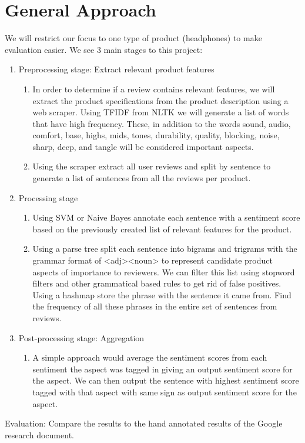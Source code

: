\documentclass{article}
\begin{document}
\section{General Approach}
We will restrict our focus to one type of product (headphones) to make evaluation easier. We see 3 main stages to this project:

\begin{enumerate}
\item Preprocessing stage: Extract relevant product features
\newline 
	\begin{enumerate} [label* = \arabic*.]
	\item	In order to determine if a review contains relevant features, we will extract the product specifications from the product description using a web scraper. Using TFIDF from NLTK we will generate a list of words that have high frequency. These, in addition to the words sound, audio, comfort, base, highs, mids, tones, durability, quality, blocking, noise, sharp, deep, and tangle will be considered important aspects. 
	\\
	\item Using the scraper extract all user reviews and split by sentence to generate a list of sentences from all the reviews per product.
	\end{enumerate}
\item Processing stage
	\begin{enumerate} [label* = \arabic*.]
	\item Using SVM or Naive Bayes annotate each sentence with a sentiment score based on the previously created list of relevant features for the product. 
	\item Using a parse tree split each sentence into bigrams and trigrams with the grammar format of <adj><noun> to represent candidate product aspects of importance to reviewers. We can filter this list using stopword filters and other grammatical based rules to get rid of false positives. Using a hashmap store the phrase with the sentence it came from. Find the frequency of all these phrases in the entire set of sentences from reviews.
	\end{enumerate}
\item Post-processing stage: Aggregation
	\begin{enumerate}[label* = \arabic*.]
	\item A simple approach would average the sentiment scores from each sentiment the aspect was tagged in giving an output sentiment score for the aspect. We can then output the sentence with highest sentiment score tagged with that aspect with same sign as output sentiment score for the aspect.
	\end{enumerate}
\end{enumerate}
Evaluation: Compare the results to the hand annotated results of the Google research document. 
\end{document}
